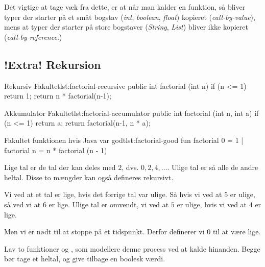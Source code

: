         Det vigtige at tage væk fra dette, er at når man kalder en
        funktion, så bliver typer der starter på et småt bogstav
        (\emph{int}, \emph{boolean}, \emph{float}) kopieret
        (\emph{call-by-value}), mens at typer der starter på store
        bogstaver (\emph{String}, \emph{List}) bliver ikke kopieret
        (\emph{call-by-reference}.)


	\subsection{!Extra! Rekursion}




	\begin{JavaCode}{Rekursiv Fakultet}{lst:factorial-recursive}
		public int factorial (int n) {
			if (n <= 1)  return 1;
			return n * factorial(n-1);
		}
	\end{JavaCode}

	\begin{JavaCode}{Akkumulator Fakultet}{lst:factorial-accumulator}
		public int factorial (int n, int a) {
			if (n <= 1)  return a;
			return factorial(n-1, n * a);
		}
	\end{JavaCode}

	\begin{JavaCode}{Fakultet funktionen hvis Java var godt}{lst:factorial-good}
		fun factorial 0  =  1
		  | factorial n  =  n * factorial (n - 1)
	\end{JavaCode}

	\begin{exercise}
		Lige tal er de tal der kan deles med \(2\), dvs. \(0, 2, 4, \dots\).
		Ulige tal er så alle de andre heltal. Disse to mængder kan også defineres
		rekursivt.

		Vi ved at et tal er lige, hvis det forrige tal var ulige. Så hvis vi ved
		at \(5\) er ulige, så ved vi at \(6\) er lige. Ulige tal er omvendt, vi
		ved at \(5\) er ulige, hvis vi ved at \(4\) er lige.

		Men vi er nødt til at stoppe på et tidspunkt. Derfor definerer vi
		\(0\) til at være lige.

		Lav to funktioner  og , som modellere
		denne process ved at kalde hinanden. Begge bør tage et heltal, og give
		tilbage en boolesk værdi.


	\end{exercise}

